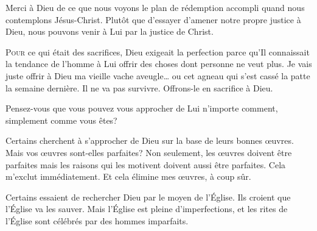 
Merci à Dieu de ce que nous voyons le plan de rédemption accompli
 quand nous contemplons Jésus-Christ.
 Plutôt que d'essayer d'amener notre propre justice à Dieu,
 nous pouvons venir à Lui par la justice de Christ. 

\dvrule







\lettrine{P}{our} ce qui était des sacrifices,
 Dieu exigeait la perfection parce qu'Il connaissait la tendance
 de l'homme à Lui offrir des choses dont personne ne veut plus.
 \Og Je vais juste offrir à Dieu ma vieille vache aveugle\dots{}
 ou cet agneau qui s'est cassé la patte la semaine dernière.
 Il ne va pas survivre. Offrons-le en sacrifice à Dieu. \Fg{}


Pensez-vous que vous pouvez vous approcher de Lui n'importe comment,
 simplement comme vous êtes? 

Certains cherchent à s'approcher de Dieu sur la base de leurs bonnes \oe{}uvres.
 Mais vos \oe{}uvres sont-elles parfaites?
 Non seulement, les \oe{}uvres doivent être parfaites mais les raisons
 qui les motivent doivent aussi être parfaites. Cela m'exclut immédiatement.
 Et cela élimine mes \oe{}uvres, à coup sûr. 

Certains essaient de rechercher Dieu par le moyen de l'Église.
 Ils croient que l'Église
 va les sauver. Mais l'Église est pleine d'imperfections,
 et les rites de l'Église sont célébrés par des hommes imparfaits. 

